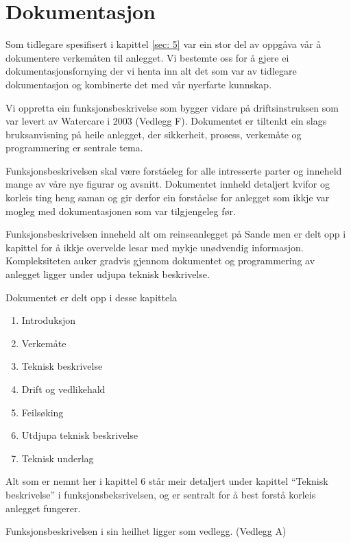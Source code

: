 \newpage
\section{Dokumentasjon}
\thispagestyle{fancy}

Som tidlegare spesifisert i kapittel \ref{sec: 5} var ein stor del av oppgåva vår å dokumentere
verkemåten til anlegget. Vi bestemte oss for å gjere ei dokumentasjonsfornying
der vi henta inn alt det som var av tidlegare dokumentasjon og kombinerte det med vår nyerfarte kunnskap.

Vi oppretta ein funksjonsbeskrivelse som bygger vidare på driftsinstruksen som var levert av 
Watercare i 2003 (Vedlegg F). Dokumentet er tiltenkt ein slags bruksanvisning på heile anlegget,
der sikkerheit, prosess, verkemåte og programmering er sentrale tema.

Funksjonsbeskrivelsen skal være forståeleg for alle intresserte parter og inneheld 
mange av våre nye figurar og avsnitt. Dokumentet innheld detaljert kvifor og korleis
ting heng saman og gir derfor ein forståelse for anlegget som ikkje var mogleg med dokumentasjonen som var tilgjengeleg før.

Funksjonsbeskrivelsen inneheld alt om reinseanlegget på Sande men er delt opp i kapittel for å ikkje
overvelde lesar med mykje unødvendig informasjon. Kompleksiteten auker gradvis gjennom dokumentet
og programmering av anlegget ligger under udjupa teknisk beskrivelse.

Dokumentet er delt opp i desse kapittela

\begin{enumerate}
    \item Introduksjon
    \item Verkemåte
    \item Teknisk beskrivelse
    \item Drift og vedlikehald
    \item Feilsøking
    \item Utdjupa teknisk beskrivelse
    \item Teknisk underlag
\end{enumerate}

Alt som er nemnt her i kapittel 6 står meir detaljert under kapittel ``Teknisk beskrivelse'' i funksjonsbeksrivelsen, og
er sentralt for å best forstå korleis anlegget fungerer.

Funksjonsbeskrivelsen i sin heilhet ligger som vedlegg. (Vedlegg A)